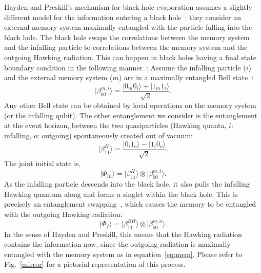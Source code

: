 \documentclass[12pt,letterpaper,aps,onecolumn,superscriptaddress,floatfix,notitlepage]{revtex4-1}
\begin{document}
	Hayden and Preskill's mechanism for black hole evaporation assumes a slightly different model for the information entering a black hole~\cite{preskill,projection}: they consider an external memory system maximally entangled with the particle falling into the black hole. The black hole swaps the correlations between the memory system and the infalling particle to correlations between the memory system and the  outgoing Hawking radiation. This can happen in black holes having a final state boundary condition in the following manner~\cite{projection}: Assume the infalling particle ($i$) and the external memory system ($m$) are in a maximally entangled Bell state~\cite{niels}:
	\begin{equation}
	\label{eq:mem}
	|\beta^{m,i}_{00}\rangle =\frac{|0_{m}0_{i}\rangle+|1_{m}1_{i}\rangle}{\sqrt{2}}. 
	\end{equation}
	Any other Bell state can be obtained by local operations on the memory system (or the infalling qubit). The other entanglement we consider is the entanglement at the event horizon, between the two quasiparticles (Hawking quanta, $i$: infalling, $o$: outgoing) spontaneously created out of vacuum:
	\begin{equation}
	|\beta^{H}_{11}\rangle =\frac{|0_{i}1_{o}\rangle-|1_{i}0_{o}\rangle}{\sqrt{2}}. 
	\end{equation}	
	The joint initial state is,
	\begin{equation}
	|\Phi_{in}\rangle = |\beta^{H}_{11}\rangle\otimes|\beta^{m,i}_{00}\rangle.
	\end{equation}
	As the infalling particle descends into the black hole, it also pulls the infalling Hawking quantum along and forms a singlet within the black hole. This is precisely an entanglement swapping~\cite{zukowski1993event}, which causes the memory to be entangled with the outgoing Hawking radiation:
	\begin{equation}
	|\Phi_{f}\rangle = |\beta^{BH}_{11}\rangle\otimes|\beta^{m,o}_{00}\rangle.
	\end{equation}
	In the sense of Hayden and Preskill, this means that the Hawking radiation contains the information now, since the outgoing radiation is maximally entangled with the memory system as in equation~\eqref{eq:mem}. Please refer to Fig.~\ref{mirror} for a pictorial representation of this process.
	
\end{document}
